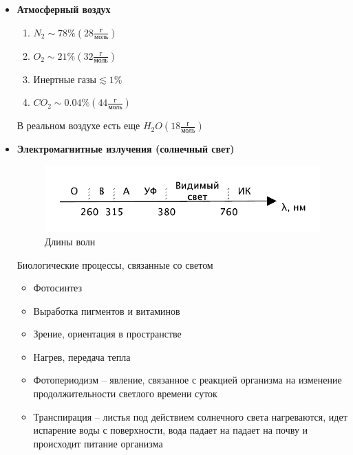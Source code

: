\begin{itemize}
    \item \textbf{Атмосферный воздух}
        \begin{enumerate}
            \item $N_2 \sim 78 \% (28 \frac{\text{г}}{\text{моль}})$
            \item $O_2 \sim 21 \% (32 \frac{\text{г}}{\text{моль}})$
            \item $\text{Инертные газы} \lesssim 1 \%$
            \item $CO_2 \sim 0.04 \% (44 \frac{\text{г}}{\text{моль}})$
        \end{enumerate}
        В реальном воздухе есть еще
        $H_2O (18 \frac{\text{г}}{\text{моль}})$

    \item \textbf{Электромагнитные излучения (солнечный свет)}

        \begin{figure}[H]
            \centering
            \includegraphics[scale=1]{img/light.pdf}
            \caption{Длины волн}
        \end{figure}

        Биологические процессы, связанные со светом
        \begin{itemize}
            \item Фотосинтез
            \item Выработка пигментов и витаминов
            \item Зрение, ориентация в пространстве
            \item Нагрев, передача тепла
            \item Фотопериодизм -- явление, связанное с реакцией
                организма на изменение продолжительности
                светлого времени суток
            \item Транспирация -- листья под действием
                солнечного света нагреваются, идет испарение воды
                с поверхности, вода падает на падает на почву и
                происходит питание организма
        \end{itemize}


\end{itemize}
